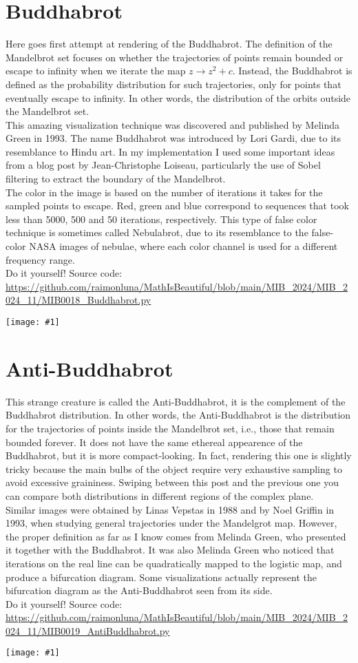 \documentclass[12pt,landscape]{article}
\newcommand{\artpage}[3][]{%
  \begin{minipage}[t]{0.48\linewidth}
    \vspace{0pt} %
    \section*{#2} %
    \addcontentsline{toc}{section}{#2} %
    #3 %
  \end{minipage}%
  \hfill
  \begin{minipage}[t]{0.48\linewidth}
    \vspace{0pt} %
    \centering
    \texttt{[image: \#1]}
  \end{minipage}%
  \newpage
}
\begin{document}
\artpage[../Output/LowQuality/MIB0018_Buddhabrot.png]{Buddhabrot}{%
Here goes first attempt at rendering of the Buddhabrot. The definition of the Mandelbrot set focuses on whether the trajectories of points remain bounded or escape to infinity when we iterate the map $z \to z^2 + c$. Instead, the Buddhabrot is defined as the probability distribution for such trajectories, only for points that eventually escape to infinity. In other words, the distribution of the orbits outside the Mandelbrot set.\\

This amazing visualization technique was discovered and published by Melinda Green in 1993. The name Buddhabrot was introduced by Lori Gardi, due to its resemblance to Hindu art. In my implementation I used some important ideas from a blog post by Jean-Christophe Loiseau, particularly the use of Sobel filtering to extract the boundary of the Mandelbrot.\\

The color in the image is based on the number of iterations it takes for the sampled points to escape. Red, green and blue correspond to sequences that took less than 5000, 500 and 50 iterations, respectively. This type of false color technique is sometimes called Nebulabrot, due to its resemblance to the false-color NASA images of nebulae, where each color channel is used for a different frequency range.  \\

Do it yourself! Source code: \url{https://github.com/raimonluna/MathIsBeautiful/blob/main/MIB_2024/MIB_2024_11/MIB0018_Buddhabrot.py}
}

\artpage[../Output/LowQuality/MIB0019_AntiBuddhabrot.png]{Anti-Buddhabrot}{%
This strange creature is called the Anti-Buddhabrot, it is the complement of the Buddhabrot distribution. In other words, the Anti-Buddhabrot is the distribution for the trajectories of points inside the Mandelbrot set, i.e., those that remain bounded forever. It does not have the same ethereal appearence of the Buddhabrot, but it is more compact-looking. In fact, rendering this one is slightly tricky because the main bulbs of the object require very exhaustive sampling to avoid excessive graininess. Swiping between this post and the previous one you can compare both distributions in different regions of the complex plane.\\

Similar images were obtained by Linas Vepstas in 1988 and by Noel Griffin in 1993, when studying general trajectories under the Mandelgrot map. However, the proper definition as far as I know comes from Melinda Green, who presented it together with the Buddhabrot. It was also Melinda Green who noticed that iterations on the real line can be quadratically mapped to the logistic map, and produce a bifurcation diagram. Some visualizations actually represent the bifurcation diagram as the Anti-Buddhabrot seen from its side.\\

Do it yourself! Source code: \url{https://github.com/raimonluna/MathIsBeautiful/blob/main/MIB_2024/MIB_2024_11/MIB0019_AntiBuddhabrot.py}
}
\end{document}

